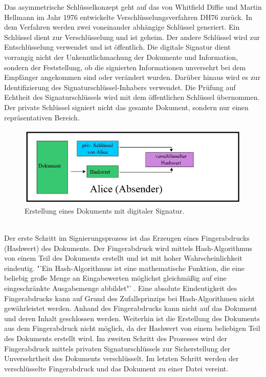 Das asymmetrische Schlüsselkonzept geht auf das von Whitfield Diffie und Martin Hellmann im Jahr 1976 entwickelte Verschlüsselungsverfahren DH76 zurück. In dem Verfahren werden zwei voneinander abhängige Schlüssel generiert. Ein Schlüssel dient zur Verschlüsselung und ist geheim. Der andere Schlüssel wird zur Entschlüsselung verwendet und ist öffentlich. Die digitale Signatur dient vorrangig nicht der Unkenntlichmachung der Dokumente und Information, sondern der Feststellung, ob die signierten Informationen unversehrt bei dem Empfänger angekommen sind oder verändert wurden. Darüber hinaus wird es zur Identifizierung des Signaturschlüssel-Inhabers verwendet. Die Prüfung auf Echtheit des Signaturschlüssels wird mit dem öffentlichen Schlüssel übernommen. Der private Schlüssel signiert nicht das gesamte Dokument, sondern nur einen repräsentativen Bereich. \cite{techno1}
\begin{figure}[!ht]
    \centering
    \includegraphics[width=\textwidth]{ErstellungAbsender2.jpg}
    \caption[Erstellung eines Dokuments mit digitaler Signatur]{\small{Erstellung eines Dokuments mit digitaler Signatur. \cite{techno3}}}
    \label{fig:2}
\end{figure}\\
Der erste Schritt im Signierungsprozess ist das Erzeugen eines Fingerabdrucks (Hashwert) des Dokuments. Der Fingerabdruck wird mittels Hash-Algorithmus von einem Teil des Dokuments erstellt und ist mit hoher Wahrscheinlichkeit eindeutig. "'Ein Hash-Algorithmus ist eine mathematische Funktion, die eine beliebig große Menge an Eingabewerten möglichst gleichmäßig auf eine eingeschränkte Ausgabemenge abbildet"' \cite{techno2}. Eine absolute Eindeutigkeit des Fingerabdrucks kann auf Grund des Zufallsprinzips bei Hash-Algorithmen nicht gewährleistet werden. Anhand des Fingerabdrucks kann nicht auf das Dokument und deren Inhalt geschlossen werden. Weiterhin ist die Erstellung des Dokuments aus dem Fingerabdruck nicht möglich, da der Hashwert von einem beliebigen Teil des Dokuments erstellt wird. Im zweiten Schritt des Prozesses wird der Fingerabdruck mittels privaten Signaturschlüssels zur Sicherstellung der Unversehrtheit des Dokuments verschlüsselt. Im letzten Schritt werden der verschlüsselte Fingerabdruck und das Dokument zu einer Datei vereint. \cite{techno1}   
